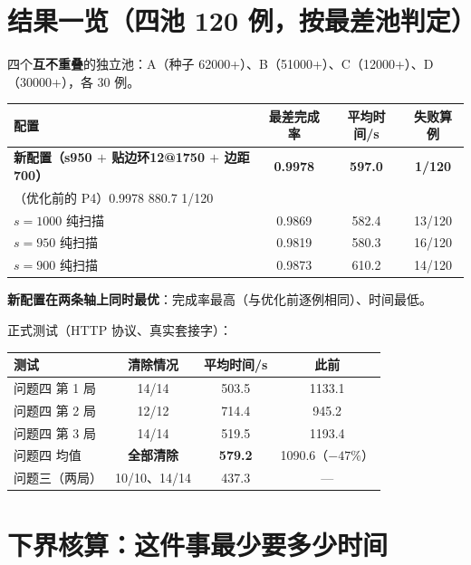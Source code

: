 \tableofcontents
\newpage

\section{结果一览（四池 120 例，按最差池判定）}

四个\textbf{互不重叠}的独立池：A（种子 62000+）、B（51000+）、C（12000+）、D（30000+），各 30 例。

\begin{center}
\begin{tabular}{lccc}
\toprule
配置 & 最差完成率 & 平均时间/s & 失败算例 \\ \midrule
\textbf{新配置（s950 $+$ 贴边环12@1750 $+$ 边距700）} & \textbf{0.9978} & \textbf{597.0} & \textbf{1/120} \\
\multicolumn{4}{l}{\footnotesize （优化前的 P4）\hfill 0.9978 \hfill 880.7 \hfill 1/120} \\
$s{=}1000$ 纯扫描 & 0.9869 & 582.4 & 13/120 \\
$s{=}950$ 纯扫描 & 0.9819 & 580.3 & 16/120 \\
$s{=}900$ 纯扫描 & 0.9873 & 610.2 & 14/120 \\
\bottomrule
\end{tabular}
\end{center}

\textbf{新配置在两条轴上同时最优}：完成率最高（与优化前逐例相同）、时间最低。

正式测试（HTTP 协议、真实套接字）：
\begin{center}
\begin{tabular}{lccc}
\toprule
测试 & 清除情况 & 平均时间/s & 此前 \\ \midrule
问题四 第 1 局 & 14/14 & 503.5 & 1133.1 \\
问题四 第 2 局 & 12/12 & 714.4 & 945.2 \\
问题四 第 3 局 & 14/14 & 519.5 & 1193.4 \\
\midrule
问题四 均值 & \textbf{全部清除} & \textbf{579.2} & 1090.6（$-47\%$） \\
问题三（两局） & 10/10、14/14 & 437.3 & --- \\
\bottomrule
\end{tabular}
\end{center}

\section{下界核算：这件事最少要多少时间}

